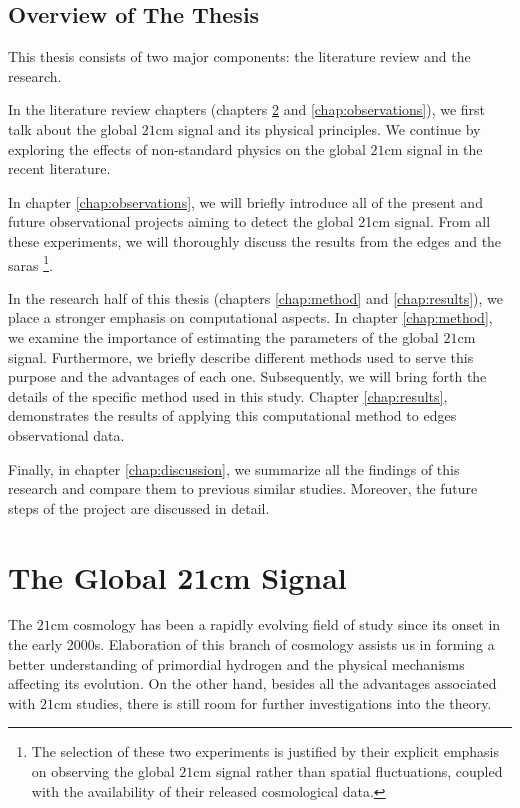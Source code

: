 \documentclass[12pt, TexShade, letterpaper]{report}
\begin{document}
\section{Overview of The Thesis}
This thesis consists of two major components: the literature review and the research.\par
In the literature review chapters (chapters \ref{chap:global21cm} and \ref{chap:observations}), we first talk about the global $\mathrm{21cm}$ signal and its physical principles. We continue by exploring the effects of non-standard physics on the global $\mathrm{21cm}$ signal in the recent literature. \par
In chapter \ref{chap:observations}, we will briefly introduce all of the present and future observational projects aiming to detect the global 21cm signal. From all these experiments, we will thoroughly discuss the results from the \gls{edges} \cite{edges} and the \gls{saras} \cite{saras_1} \footnote{The selection of these two experiments is justified by their explicit emphasis on observing the global $\mathrm{21cm}$ signal rather than spatial fluctuations, coupled with the availability of their released cosmological data.}.\par
In the research half of this thesis (chapters \ref{chap:method} and \ref{chap:results}), we place a stronger emphasis on computational aspects. 
In chapter \ref{chap:method}, we examine the importance of estimating the parameters of the global $\mathrm{21cm}$ signal. Furthermore, we briefly describe different methods used to serve this purpose and the advantages of each one. Subsequently, we will bring forth the details of the specific method used in this study. Chapter \ref{chap:results}, demonstrates the results of applying this computational method to \gls{edges} observational data.\par
Finally, in chapter \ref{chap:discussion}, we summarize all the findings of this research and compare them to previous similar studies. Moreover, the future steps of the project are discussed in detail.\par

\chapter{The Global 21cm Signal}
\label{chap:global21cm}
The $\mathrm{21cm}$ cosmology has been a rapidly evolving field of study since its onset in the early 2000s. Elaboration of this branch of cosmology assists us in forming a better understanding of primordial hydrogen and the physical mechanisms affecting its evolution. On the other hand, besides all the advantages associated with $\mathrm{21cm}$ studies, there is still
room for further investigations into the theory. \par
\end{document}

